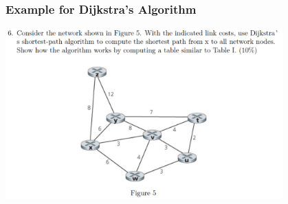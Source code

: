 \documentclass[xcolor=dvipsnames]{beamer}
\begin{document}
    \begin{frame}
        \frametitle{Example for Dijkstra's Algorithm}
        \begin{center}
            \includegraphics[width=0.8\textwidth]{src/dijkstra-example.png}
        \end{center}
    \end{frame}
\end{document}
